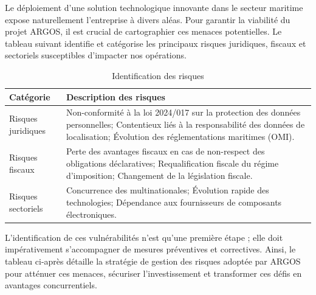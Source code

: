 Le déploiement d'une solution technologique innovante dans le secteur maritime expose naturellement l'entreprise à divers aléas. Pour garantir la viabilité du projet ARGOS, il est crucial de cartographier ces menaces potentielles. Le tableau suivant identifie et catégorise les principaux risques juridiques, fiscaux et sectoriels susceptibles d'impacter nos opérations.

\begin{table}[H]
    \centering
    \caption{Identification des risques}
    \label{tab:identification_risques}
    \renewcommand{\arraystretch}{1.5}
    \begin{tabularx}{\textwidth}{|>{\raggedright\arraybackslash}p{4cm}|X|}
        \hline
        \textbf{Catégorie} & \textbf{Description des risques} \\
        \hline
        Risques juridiques & Non-conformité à la loi 2024/017 sur la protection des données personnelles; Contentieux liés à la responsabilité des données de localisation; Évolution des réglementations maritimes (OMI). \\
        \hline
        Risques fiscaux & Perte des avantages fiscaux en cas de non-respect des obligations déclaratives; Requalification fiscale du régime d'imposition; Changement de la législation fiscale. \\
        \hline
        Risques sectoriels & Concurrence des multinationales; Évolution rapide des technologies; Dépendance aux fournisseurs de composants électroniques. \\
        \hline
    \end{tabularx}
    \tablesourcepromoteurs
\end{table}

L'identification de ces vulnérabilités n'est qu'une première étape ; elle doit impérativement s'accompagner de mesures préventives et correctives. Ainsi, le tableau ci-après détaille la stratégie de gestion des risques adoptée par ARGOS pour atténuer ces menaces, sécuriser l'investissement et transformer ces défis en avantages concurrentiels.

